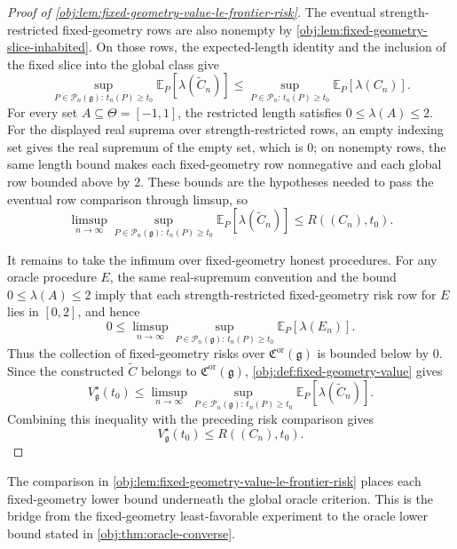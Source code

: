 \documentclass[11pt]{article}
\begin{document}
\begin{proof}[Proof of \cref{obj:lem:fixed-geometry-value-le-frontier-risk}]
The eventual strength-restricted fixed-geometry rows are also nonempty by \cref{obj:lem:fixed-geometry-slice-inhabited}.  On those rows, the expected-length identity and the inclusion of the fixed slice into the global class give
\[
\sup_{P\in\mathcal P_n(\mathfrak g):\,t_n(P)\ge t_0}
\mathbb E_P[\lambda(\widetilde C_n)]
\le
\sup_{P\in\mathcal P_n:\,t_n(P)\ge t_0}
\mathbb E_P[\lambda(C_n)].
\]
For every set \(A\subseteq\Theta=[-1,1]\), the restricted length satisfies \(0\le\lambda(A)\le2\).  For the displayed real suprema over strength-restricted rows, an empty indexing set gives the real supremum of the empty set, which is \(0\); on nonempty rows, the same length bound makes each fixed-geometry row nonnegative and each global row bounded above by \(2\).  These bounds are the hypotheses needed to pass the eventual row comparison through limsup, so
\[
\limsup_{n\to\infty}
\sup_{P\in\mathcal P_n(\mathfrak g):\,t_n(P)\ge t_0}
\mathbb E_P[\lambda(\widetilde C_n)]
\le
R((C_n),t_0).
\]

It remains to take the infimum over fixed-geometry honest procedures.  For any oracle procedure \(E\), the same real-supremum convention and the bound \(0\le\lambda(A)\le2\) imply that each strength-restricted fixed-geometry risk row for \(E\) lies in \([0,2]\), and hence
\[
0\le
\limsup_{n\to\infty}
\sup_{P\in\mathcal P_n(\mathfrak g):\,t_n(P)\ge t_0}
\mathbb E_P[\lambda(E_n)].
\]
Thus the collection of fixed-geometry risks over \(\mathfrak C^{\mathrm{or}}(\mathfrak g)\) is bounded below by \(0\).  Since the constructed \(\widetilde C\) belongs to \(\mathfrak C^{\mathrm{or}}(\mathfrak g)\), \cref{obj:def:fixed-geometry-value} gives
\[
V_{\mathfrak g}^\star(t_0)
\le
\limsup_{n\to\infty}
\sup_{P\in\mathcal P_n(\mathfrak g):\,t_n(P)\ge t_0}
\mathbb E_P[\lambda(\widetilde C_n)].
\]
Combining this inequality with the preceding risk comparison gives
\[
V_{\mathfrak g}^\star(t_0)\le R((C_n),t_0).
\]
\end{proof}

The comparison in \cref{obj:lem:fixed-geometry-value-le-frontier-risk} places each fixed-geometry lower bound underneath the global oracle criterion. This is the bridge from the fixed-geometry least-favorable experiment to the oracle lower bound stated in \cref{obj:thm:oracle-converse}.
\end{document}
